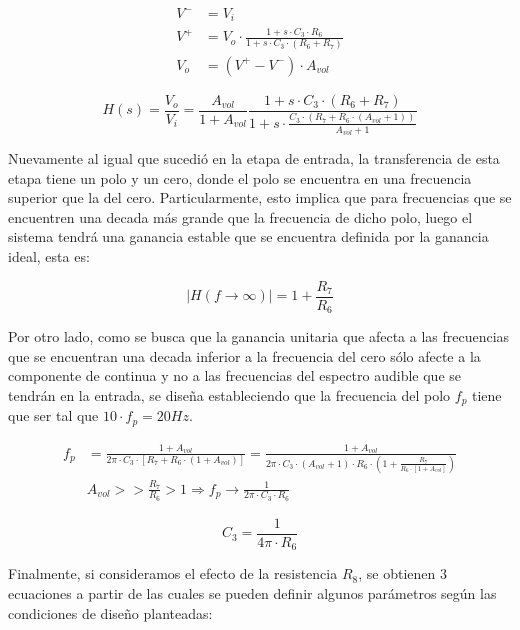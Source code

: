 \begin{align*}
    V^{-} &= V_i \\
    V^{+} &= V_o \cdot \frac{1 + s \cdot C_3 \cdot R_6}{1 + s \cdot C_3 \cdot (R_6 + R_7)} \\
    V_o &= (V^{+} - V^{-}) \cdot A_{vol}
\end{align*}

\begin{equation}
    H(s) = \frac{V_o}{V_i} = \frac{A_{vol}}{1 + A_{vol}}\frac{1 + s \cdot C_3 \cdot (R_6 + R_7)}{1 + s \cdot \frac{C_3 \cdot (R_7 + R_6 \cdot (A_{vol} + 1))}{A_{vol} + 1}}
    \label{eq:funcion_ampli_completa}
\end{equation}

Nuevamente al igual que sucedi\'o en la etapa de entrada, la transferencia de esta etapa tiene un polo y un cero, donde el polo se encuentra en una frecuencia superior que la del cero. Particularmente,
esto implica que para frecuencias que se encuentren una decada m\'as grande que la frecuencia de dicho polo, luego el sistema tendr\'a una ganancia estable que se encuentra definida por la ganancia ideal,
esta es:

\begin{equation}
    |H(f \rightarrow \infty)| = 1 + \frac{R_7}{R_6}
\end{equation}

Por otro lado, como se busca que la ganancia unitaria que afecta a las frecuencias que se encuentran una decada inferior a la frecuencia del cero s\'olo afecte a la componente de continua y no a las frecuencias del
espectro audible que se tendr\'an en la entrada, se dise\~na estableciendo que la frecuencia del polo $f_p$ tiene que ser tal que $10 \cdot f_p = 20Hz$.

\begin{align*}
    f_p & = \frac{1 + A_{vol}}{2 \pi \cdot C_3 \cdot \left[ R_7 + R_6 \cdot (1 + A_{vol}) \right]} = \frac{1 + A_{vol}}{2 \pi \cdot C_3 \cdot (A_{vol} + 1) \cdot R_6 \cdot (1 + \frac{R_7}{R_6 \cdot \left[ 1 + A_{vol} \right]}) } \\ 
    & A_{vol} >> \frac{R_7}{R_6} > 1 \Rightarrow f_p \rightarrow \frac{1}{2 \pi \cdot C_3 \cdot R_6}
\end{align*}

\begin{equation}
    C_3 = \frac{1}{4 \pi \cdot R_6}
\end{equation}

Finalmente, si consideramos el efecto de la resistencia $R_8$, se obtienen 3 ecuaciones a partir de las cuales se pueden definir
algunos par\'ametros seg\'un las condiciones de dise\~no planteadas:

